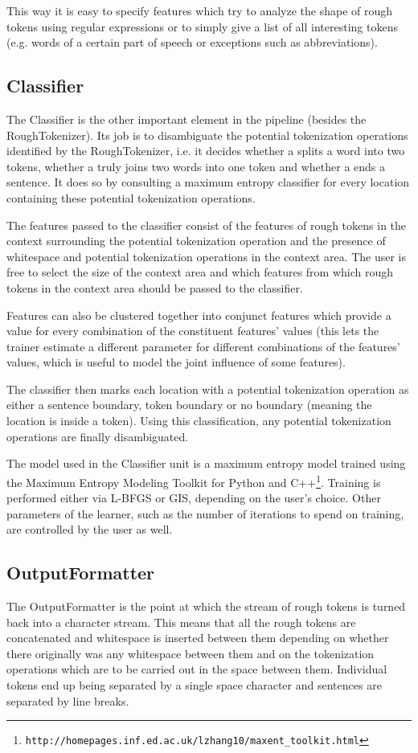 This way it is easy to specify features which try to analyze the shape
of rough tokens using regular expressions or to simply give a list of
all interesting tokens (e.g. words of a certain part of speech or
exceptions such as abbreviations).

\subsection{Classifier}

The Classifier is the other important element in the pipeline (besides
the RoughTokenizer). Its job is to disambiguate the potential
tokenization operations identified by the RoughTokenizer, i.e. it
decides whether a \maysplit{} splits a word into two tokens, whether a
\mayjoin{} truly joins two words into one token and whether a
\maybreaksentence{} ends a sentence. It does so by consulting a
maximum entropy classifier for every location containing these
potential tokenization operations.

The features passed to the classifier consist of the features of rough
tokens in the context surrounding the potential tokenization operation
and the presence of whitespace and potential tokenization operations
in the context area. The user is free to select the size of the
context area and which features from which rough tokens in the context
area should be passed to the classifier.

Features can also be clustered together into conjunct features which
provide a value for every combination of the constituent features'
values (this lets the trainer estimate a different parameter for
different combinations of the features' values, which is useful to
model the joint influence of some features).

The classifier then marks each location with a potential tokenization
operation as either a sentence boundary, token boundary or no boundary
(meaning the location is inside a token). Using this classification,
any potential tokenization operations are finally disambiguated.

The model used in the Classifier unit is a maximum entropy model
trained using the Maximum Entropy Modeling Toolkit for Python and
C++\footnote{\texttt{http://homepages.inf.ed.ac.uk/lzhang10/maxent\_toolkit.html}}.
Training is performed either via L-BFGS or GIS, depending on the
user's choice. Other parameters of the learner, such as the number of
iterations to spend on training, are controlled by the user as well.

\subsection{OutputFormatter}

The OutputFormatter is the point at which the stream of rough tokens
is turned back into a character stream. This means that all the rough
tokens are concatenated and whitespace is inserted between them
depending on whether there originally was any whitespace between them
and on the tokenization operations which are to be carried out in the
space between them. Individual tokens end up being separated by a
single space character and sentences are separated by line breaks.
